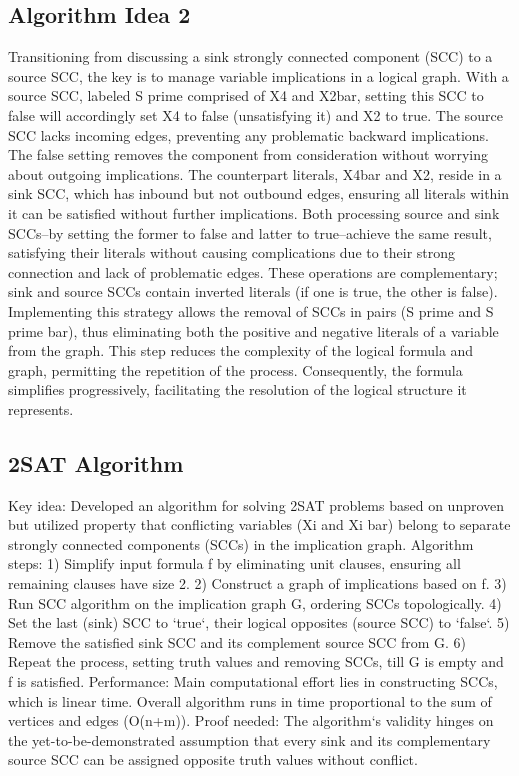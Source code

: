 \subsection*{Algorithm Idea 2}
Transitioning from discussing a sink strongly connected component (SCC) to a source SCC, the key is to manage variable implications in a logical graph.
With a source SCC, labeled S prime comprised of X4 and X2bar, setting this SCC to false will accordingly set X4 to false (unsatisfying it) and X2 to true.
The source SCC lacks incoming edges, preventing any problematic backward implications.
The false setting removes the component from consideration without worrying about outgoing implications.
The counterpart literals, X4bar and X2, reside in a sink SCC, which has inbound but not outbound edges, ensuring all literals within it can be satisfied without further implications.
Both processing source and sink SCCs--by setting the former to false and latter to true--achieve the same result, satisfying their literals without causing complications due to their strong connection and lack of problematic edges.
These operations are complementary; sink and source SCCs contain inverted literals (if one is true, the other is false).
Implementing this strategy allows the removal of SCCs in pairs (S prime and S prime bar), thus eliminating both the positive and negative literals of a variable from the graph.
This step reduces the complexity of the logical formula and graph, permitting the repetition of the process.
Consequently, the formula simplifies progressively, facilitating the resolution of the logical structure it represents.

\subsection*{2SAT Algorithm}
Key idea: Developed an algorithm for solving 2SAT problems based on unproven but utilized property that conflicting variables (Xi and Xi bar) belong to separate strongly connected components (SCCs) in the implication graph.
Algorithm steps: 1) Simplify input formula f by eliminating unit clauses, ensuring all remaining clauses have size 2.
2) Construct a graph of implications based on f.
3) Run SCC algorithm on the implication graph G, ordering SCCs topologically.
4) Set the last (sink) SCC to `true`, their logical opposites (source SCC) to `false`.
5) Remove the satisfied sink SCC and its complement source SCC from G\@.
6) Repeat the process, setting truth values and removing SCCs, till G is empty and f is satisfied.
Performance: Main computational effort lies in constructing SCCs, which is linear time.
Overall algorithm runs in time proportional to the sum of vertices and edges (O(n+m)).
Proof needed: The algorithm`s validity hinges on the yet-to-be-demonstrated assumption that every sink and its complementary source SCC can be assigned opposite truth values without conflict.

